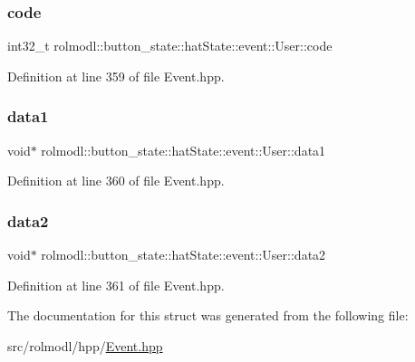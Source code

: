 \subsubsection{\texorpdfstring{code}{code}}
{\footnotesize\ttfamily int32\+\_\+t rolmodl\+::button\+\_\+state\+::hat\+State\+::event\+::\+User\+::code}



Definition at line 359 of file Event.\+hpp.

\mbox{\label{structrolmodl_1_1button__state_1_1hat_state_1_1event_1_1_user_a46245919037d02ddaedf718515dda29d}} 
\subsubsection{\texorpdfstring{data1}{data1}}
{\footnotesize\ttfamily void$\ast$ rolmodl\+::button\+\_\+state\+::hat\+State\+::event\+::\+User\+::data1}



Definition at line 360 of file Event.\+hpp.

\mbox{\label{structrolmodl_1_1button__state_1_1hat_state_1_1event_1_1_user_a5bd205ed153ce3aababdbc93bef8ed8d}} 
\subsubsection{\texorpdfstring{data2}{data2}}
{\footnotesize\ttfamily void$\ast$ rolmodl\+::button\+\_\+state\+::hat\+State\+::event\+::\+User\+::data2}



Definition at line 361 of file Event.\+hpp.



The documentation for this struct was generated from the following file\+:\begin{DoxyCompactItemize}
\item 
src/rolmodl/hpp/\mbox{\hyperlink{_event_8hpp}{Event.\+hpp}}\end{DoxyCompactItemize}
